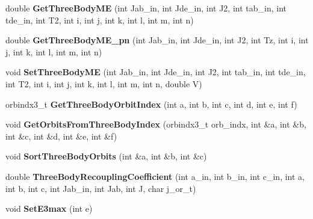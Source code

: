 \begin{DoxyCompactItemize}
\item 
\hypertarget{classOperator_ab2f0275c25ffb0f04935cb9d6ea043e1}{double {\bfseries Get\-Three\-Body\-M\-E} (int Jab\-\_\-in, int Jde\-\_\-in, int J2, int tab\-\_\-in, int tde\-\_\-in, int T2, int i, int j, int k, int l, int m, int n)}\label{classOperator_ab2f0275c25ffb0f04935cb9d6ea043e1}

\item 
\hypertarget{classOperator_aa6b8824f440eb3217454b9d242526fd6}{double {\bfseries Get\-Three\-Body\-M\-E\-\_\-pn} (int Jab\-\_\-in, int Jde\-\_\-in, int J2, int Tz, int i, int j, int k, int l, int m, int n)}\label{classOperator_aa6b8824f440eb3217454b9d242526fd6}

\item 
\hypertarget{classOperator_a997b0b2df75089a9e910c19410ebd8db}{void {\bfseries Set\-Three\-Body\-M\-E} (int Jab\-\_\-in, int Jde\-\_\-in, int J2, int tab\-\_\-in, int tde\-\_\-in, int T2, int i, int j, int k, int l, int m, int n, double V)}\label{classOperator_a997b0b2df75089a9e910c19410ebd8db}

\item 
\hypertarget{classOperator_a78c235a23140618f76e5d17e2afc4582}{orbindx3\-\_\-t {\bfseries Get\-Three\-Body\-Orbit\-Index} (int a, int b, int c, int d, int e, int f)}\label{classOperator_a78c235a23140618f76e5d17e2afc4582}

\item 
\hypertarget{classOperator_aaa9163ed47bb4c3330c58fcab09d4cae}{void {\bfseries Get\-Orbits\-From\-Three\-Body\-Index} (orbindx3\-\_\-t orb\-\_\-indx, int \&a, int \&b, int \&c, int \&d, int \&e, int \&f)}\label{classOperator_aaa9163ed47bb4c3330c58fcab09d4cae}

\item 
\hypertarget{classOperator_a3633fb9e34c473ce0389ebe073157171}{void {\bfseries Sort\-Three\-Body\-Orbits} (int \&a, int \&b, int \&c)}\label{classOperator_a3633fb9e34c473ce0389ebe073157171}

\item 
\hypertarget{classOperator_a894e29959b3f7b2008c4442683bf8642}{double {\bfseries Three\-Body\-Recoupling\-Coefficient} (int a\-\_\-in, int b\-\_\-in, int c\-\_\-in, int a, int b, int c, int Jab\-\_\-in, int Jab, int J, char j\-\_\-or\-\_\-t)}\label{classOperator_a894e29959b3f7b2008c4442683bf8642}

\item 
\hypertarget{classOperator_a8b32ed75e5e0d6175a2f2f517c63a89c}{void {\bfseries Set\-E3max} (int e)}\label{classOperator_a8b32ed75e5e0d6175a2f2f517c63a89c}


\end{DoxyCompactItemize}
